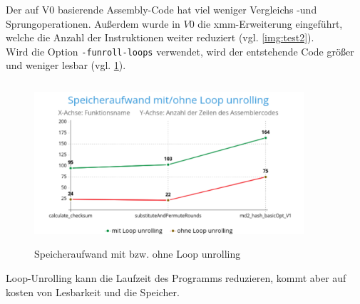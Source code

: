 Der auf V0 basierende Assembly-Code hat viel weniger Vergleichs -und Sprungoperationen.
Außerdem wurde in $V0$ die xmm-Erweiterung eingeführt, welche die Anzahl der Instruktionen
weiter reduziert (vgl. \ref{img:test2}).
\\
Wird die Option \texttt{-funroll-loops} verwendet, wird der entstehende Code
größer und weniger lesbar (vgl. \ref{img:test3}).

\begin{figure}[H]
        \centering
        \includegraphics[height=6cm, width=10cm]{pics/loopUnrolling.png}
        \caption{Speicheraufwand mit bzw. ohne Loop unrolling}
        \label{img:test3}
    \noindent
\end{figure}

Loop-Unrolling kann die Laufzeit des Programms reduzieren, kommt aber auf kosten von
Lesbarkeit und die Speicher.


